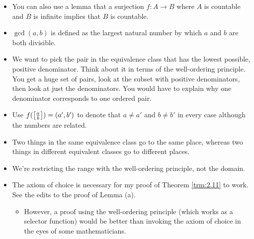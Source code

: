 \documentclass[titlepage]{report}
\begin{document}
\begin{itemize}
    \item You can also use a lemma that a surjection $f:A\to B$ where $A$ is countable and $B$ is infinite implies that $B$ is countable.
    \item $\gcd(a,b)$ is defined as the largest natural number by which $a$ and $b$ are both divisible.
    \item We want to pick the pair in the equivalence class that has the lowest possible, positive denominator. Think about it in terms of the well-ordering principle. You get a huge set of pairs, look at the subset with positive denominators, then look at just the denominators. You would have to explain why one denominator corresponds to one ordered pair.
    \item Use $f(\left[ \frac{a}{b} \right])=(a',b')$ to denote that $a\neq a'$ and $b\neq b'$ in every case although the numbers are related.
    \item Two things in the same equivalence class go to the same place, whereas two things in different equivalent classes go to different places.
    \item We're restricting the range with the well-ordering principle, not the domain.
    \item {}The axiom of choice is necessary for my proof of Theorem \ref{trm:2.11} to work. See the edits to the proof of Lemma (a).
    \begin{itemize}
        \item However, a proof using the well-ordering principle (which works as a selector function) would be better than invoking the axiom of choice in the eyes of some mathematicians.
    \end{itemize}
\end{itemize}




\end{document}
